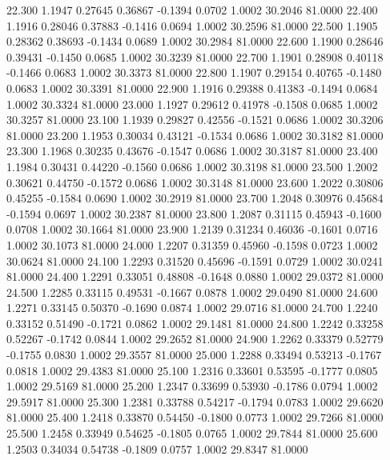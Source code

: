   22.300   1.1947   0.27645   0.36867  -0.1394   0.0702   1.0002  30.2046  81.0000
  22.400   1.1916   0.28046   0.37883  -0.1416   0.0694   1.0002  30.2596  81.0000
  22.500   1.1905   0.28362   0.38693  -0.1434   0.0689   1.0002  30.2984  81.0000
  22.600   1.1900   0.28646   0.39431  -0.1450   0.0685   1.0002  30.3239  81.0000
  22.700   1.1901   0.28908   0.40118  -0.1466   0.0683   1.0002  30.3373  81.0000
  22.800   1.1907   0.29154   0.40765  -0.1480   0.0683   1.0002  30.3391  81.0000
  22.900   1.1916   0.29388   0.41383  -0.1494   0.0684   1.0002  30.3324  81.0000
  23.000   1.1927   0.29612   0.41978  -0.1508   0.0685   1.0002  30.3257  81.0000
  23.100   1.1939   0.29827   0.42556  -0.1521   0.0686   1.0002  30.3206  81.0000
  23.200   1.1953   0.30034   0.43121  -0.1534   0.0686   1.0002  30.3182  81.0000
  23.300   1.1968   0.30235   0.43676  -0.1547   0.0686   1.0002  30.3187  81.0000
  23.400   1.1984   0.30431   0.44220  -0.1560   0.0686   1.0002  30.3198  81.0000
  23.500   1.2002   0.30621   0.44750  -0.1572   0.0686   1.0002  30.3148  81.0000
  23.600   1.2022   0.30806   0.45255  -0.1584   0.0690   1.0002  30.2919  81.0000
  23.700   1.2048   0.30976   0.45684  -0.1594   0.0697   1.0002  30.2387  81.0000
  23.800   1.2087   0.31115   0.45943  -0.1600   0.0708   1.0002  30.1664  81.0000
  23.900   1.2139   0.31234   0.46036  -0.1601   0.0716   1.0002  30.1073  81.0000
  24.000   1.2207   0.31359   0.45960  -0.1598   0.0723   1.0002  30.0624  81.0000
  24.100   1.2293   0.31520   0.45696  -0.1591   0.0729   1.0002  30.0241  81.0000
  24.400   1.2291   0.33051   0.48808  -0.1648   0.0880   1.0002  29.0372  81.0000
  24.500   1.2285   0.33115   0.49531  -0.1667   0.0878   1.0002  29.0490  81.0000
  24.600   1.2271   0.33145   0.50370  -0.1690   0.0874   1.0002  29.0716  81.0000
  24.700   1.2240   0.33152   0.51490  -0.1721   0.0862   1.0002  29.1481  81.0000
  24.800   1.2242   0.33258   0.52267  -0.1742   0.0844   1.0002  29.2652  81.0000
  24.900   1.2262   0.33379   0.52779  -0.1755   0.0830   1.0002  29.3557  81.0000
  25.000   1.2288   0.33494   0.53213  -0.1767   0.0818   1.0002  29.4383  81.0000
  25.100   1.2316   0.33601   0.53595  -0.1777   0.0805   1.0002  29.5169  81.0000
  25.200   1.2347   0.33699   0.53930  -0.1786   0.0794   1.0002  29.5917  81.0000
  25.300   1.2381   0.33788   0.54217  -0.1794   0.0783   1.0002  29.6620  81.0000
  25.400   1.2418   0.33870   0.54450  -0.1800   0.0773   1.0002  29.7266  81.0000
  25.500   1.2458   0.33949   0.54625  -0.1805   0.0765   1.0002  29.7844  81.0000
  25.600   1.2503   0.34034   0.54738  -0.1809   0.0757   1.0002  29.8347  81.0000
